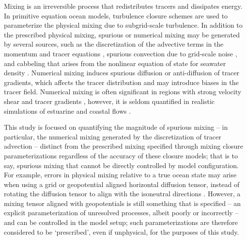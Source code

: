 \documentclass[draft]{agujournal2019}
\begin{document}
Mixing is an irreversible process that redistributes tracers and dissipates energy. In primitive equation ocean models, turbulence closure schemes are used to parameterize the physical mixing due to subgrid-scale turbulence. In addition to the prescribed physical mixing, spurious or numerical mixing may be generated by several sources, such as the discretization of the advective terms in the momentum and tracer equations \cite{Burchard_2008, gibson2017attribution, Griffies_2000, Smolarkiewicz_1983}, spurious convection due to grid-scale noise \cite{ilicak2016quantifying,Ilicak_2012}, and cabbeling that arises from the nonlinear equation of state for seawater density \cite{Ilicak_2012, mcdougall1987thermobaricity}. Numerical mixing induces spurious diffusion or anti-diffusion of tracer gradients, which affects the tracer distribution and may introduce biases in the tracer field. Numerical mixing is often significant in regions with strong velocity shear and tracer gradients \cite{Fringer_2019, Kalra_2019, Rennau_2009}, however, it is seldom quantified in realistic simulations of estuarine and coastal flows \cite{Broatch_2022, Ralston_2017, Wang_2021}.

This study is focused on quantifying the magnitude of spurious mixing -- in particular, the numerical mixing generated by the discretization of tracer advection -- distinct from the prescribed mixing specified through mixing closure parameterizations regardless of the accuracy of these closure models; that is to say, spurious mixing that cannot be directly controlled by model configuration. For example, errors in physical mixing relative to a true ocean state may arise when using a grid or geopotential aligned horizontal diffusion tensor, instead of rotating the diffusion tensor to align with the isoneutral directions \cite{griffies1998isoneutral, redi1982oceanic}. However, a mixing tensor aligned with geopotentials is still something that is specified --  an explicit parameterization of unresolved processes, albeit poorly or incorrectly -- and can be controlled in the model setup; such parameterizations are therefore considered to be `prescribed', even if unphysical, for the purposes of this study.
\end{document}
